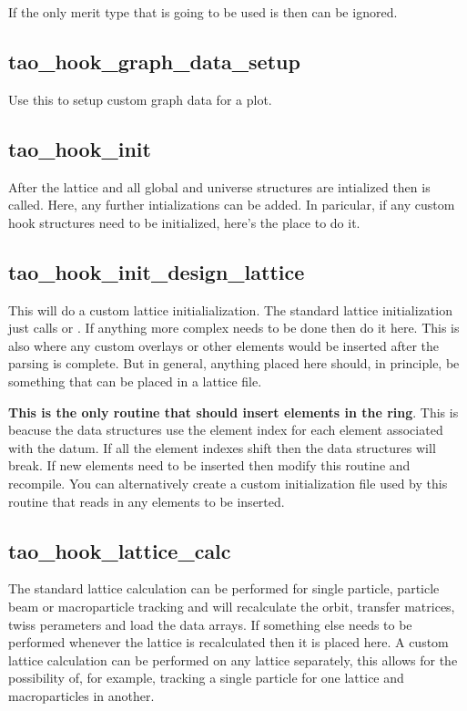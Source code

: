 {If the only merit type that is going to be used is  then
 can be ignored.

\subsection{tao\_hook\_graph\_data\_setup}

Use this to setup custom graph data for a plot.

\subsection{tao\_hook\_init}

After the lattice and all global and universe structures are
intialized then  is called. Here, any further
intializations can be added. In paricular, if any custom hook
structures need to be initialized, here's the place to do it.

\subsection{tao\_hook\_init\_design\_lattice}

This will do a custom lattice initialialization. The standard lattice
initialization just calls  or . If
anything more complex needs to be done then do it here. This is also
where any custom overlays or other elements would be inserted after
the parsing is complete. But in general, anything placed here should,
in principle, be something that can be placed in a lattice file.

\textbf{This is the only routine that should insert elements in the
ring}. This is beacuse the \tao data structures use the element index
for each element associated with the datum. If all the element indexes
shift then the data structures will break. If new elements need to be
inserted then modify this routine and recompile. You can alternatively
create a custom initialization file used by this routine that reads in
any elements to be inserted.

\subsection{tao\_hook\_lattice\_calc}

The standard lattice calculation can be performed for single particle,
particle beam or macroparticle tracking and will recalculate the
orbit, transfer matrices, twiss perameters and load the data
arrays. If something else needs to be performed whenever the lattice
is recalculated then it is placed here. A custom lattice calculation
can be performed on any lattice separately, this allows for the
possibility of, for example, tracking a single particle for one
lattice and macroparticles in another.

}
